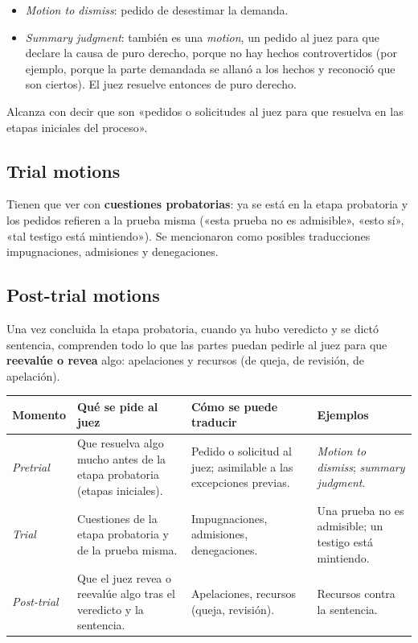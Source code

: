 \documentclass[12pt,oneside]{book}
\begin{document}
\begin{itemize}
    \item \textit{Motion to dismiss}: pedido de desestimar la demanda.
    \item \textit{Summary judgment}: también es una \textit{motion}, un pedido al juez para que declare la causa de puro derecho, porque no hay hechos controvertidos (por ejemplo, porque la parte demandada se allanó a los hechos y reconoció que son ciertos). El juez resuelve entonces de puro derecho.
\end{itemize}

Alcanza con decir que son «pedidos o solicitudes al juez para que resuelva en las etapas iniciales del proceso».

\subsection{Trial motions}

Tienen que ver con \textbf{cuestiones probatorias}: ya se está en la etapa probatoria y los pedidos refieren a la prueba misma («esta prueba no es admisible», «esto sí», «tal testigo está mintiendo»). Se mencionaron como posibles traducciones impugnaciones, admisiones y denegaciones.

\subsection{Post-trial motions}

Una vez concluida la etapa probatoria, cuando ya hubo veredicto y se dictó sentencia, comprenden todo lo que las partes puedan pedirle al juez para que \textbf{reevalúe o revea} algo: apelaciones y recursos (de queja, de revisión, de apelación).

\begin{table}[H]
\centering
\begin{tabularx}{\textwidth}{P{2cm}LLL}
\toprule
\textbf{Momento} & \textbf{Qué se pide al juez} & \textbf{Cómo se puede traducir} & \textbf{Ejemplos} \\
\midrule
\textit{Pretrial} & Que resuelva algo mucho antes de la etapa probatoria (etapas iniciales). & Pedido o solicitud al juez; asimilable a las excepciones previas. & \textit{Motion to dismiss}; \textit{summary judgment}. \\
\textit{Trial} & Cuestiones de la etapa probatoria y de la prueba misma. & Impugnaciones, admisiones, denegaciones. & Una prueba no es admisible; un testigo está mintiendo. \\
\textit{Post-trial} & Que el juez revea o reevalúe algo tras el veredicto y la sentencia. & Apelaciones, recursos (queja, revisión). & Recursos contra la sentencia. \\
\bottomrule
\end{tabularx}
\end{table}
\end{document}
